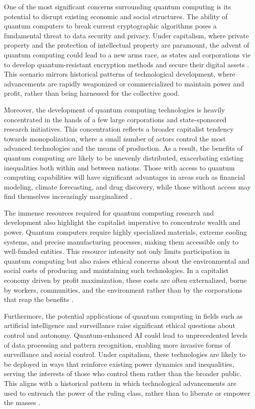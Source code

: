 \begin{refsection}
One of the most significant concerns surrounding quantum computing is its potential to disrupt existing economic and social structures. The ability of quantum computers to break current cryptographic algorithms poses a fundamental threat to data security and privacy. Under capitalism, where private property and the protection of intellectual property are paramount, the advent of quantum computing could lead to a new arms race, as states and corporations vie to develop quantum-resistant encryption methods and secure their digital assets \cite[pp.~210-213]{harvey2014seventeen}. This scenario mirrors historical patterns of technological development, where advancements are rapidly weaponized or commercialized to maintain power and profit, rather than being harnessed for the collective good.

Moreover, the development of quantum computing technologies is heavily concentrated in the hands of a few large corporations and state-sponsored research initiatives. This concentration reflects a broader capitalist tendency towards monopolization, where a small number of actors control the most advanced technologies and the means of production. As a result, the benefits of quantum computing are likely to be unevenly distributed, exacerbating existing inequalities both within and between nations. Those with access to quantum computing capabilities will have significant advantages in areas such as financial modeling, climate forecasting, and drug discovery, while those without access may find themselves increasingly marginalized \cite[pp.~45-48]{schiller2000digital}.

The immense resources required for quantum computing research and development also highlight the capitalist imperative to concentrate wealth and power. Quantum computers require highly specialized materials, extreme cooling systems, and precise manufacturing processes, making them accessible only to well-funded entities. This resource intensity not only limits participation in quantum computing but also raises ethical concerns about the environmental and social costs of producing and maintaining such technologies. In a capitalist economy driven by profit maximization, these costs are often externalized, borne by workers, communities, and the environment rather than by the corporations that reap the benefits \cite[pp.~133-136]{parikka2015anthrobscene}.

Furthermore, the potential applications of quantum computing in fields such as artificial intelligence and surveillance raise significant ethical questions about control and autonomy. Quantum-enhanced AI could lead to unprecedented levels of data processing and pattern recognition, enabling more invasive forms of surveillance and social control. Under capitalism, these technologies are likely to be deployed in ways that reinforce existing power dynamics and inequalities, serving the interests of those who control them rather than the broader public. This aligns with a historical pattern in which technological advancements are used to entrench the power of the ruling class, rather than to liberate or empower the masses \cite[pp.~98-101]{fuchs2011foundations}.


\end{refsection}
